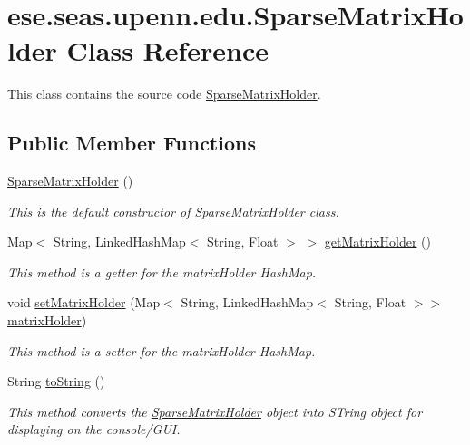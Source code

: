 \hypertarget{classese_1_1seas_1_1upenn_1_1edu_1_1_sparse_matrix_holder}{}\section{ese.\+seas.\+upenn.\+edu.\+Sparse\+Matrix\+Holder Class Reference}
\label{classese_1_1seas_1_1upenn_1_1edu_1_1_sparse_matrix_holder}


This class contains the source code \hyperlink{classese_1_1seas_1_1upenn_1_1edu_1_1_sparse_matrix_holder}{Sparse\+Matrix\+Holder}.  


\subsection*{Public Member Functions}
\begin{DoxyCompactItemize}
\item 
\hyperlink{classese_1_1seas_1_1upenn_1_1edu_1_1_sparse_matrix_holder_a53e71fa302066a4bd438da07367a6f41}{Sparse\+Matrix\+Holder} ()
\begin{DoxyCompactList}\small\item\em This is the default constructor of \hyperlink{classese_1_1seas_1_1upenn_1_1edu_1_1_sparse_matrix_holder}{Sparse\+Matrix\+Holder} class. \end{DoxyCompactList}\item 
Map$<$ String, Linked\+Hash\+Map$<$ String, Float $>$ $>$ \hyperlink{classese_1_1seas_1_1upenn_1_1edu_1_1_sparse_matrix_holder_af4939e0fb08c94f4449078f520bdede6}{get\+Matrix\+Holder} ()
\begin{DoxyCompactList}\small\item\em This method is a getter for the matrix\+Holder Hash\+Map. \end{DoxyCompactList}\item 
void \hyperlink{classese_1_1seas_1_1upenn_1_1edu_1_1_sparse_matrix_holder_a20d7d37cfc84fb9468a1581a4f1168e0}{set\+Matrix\+Holder} (Map$<$ String, Linked\+Hash\+Map$<$ String, Float $>$$>$ \hyperlink{classese_1_1seas_1_1upenn_1_1edu_1_1_sparse_matrix_holder_afd2e06193d5560f30e1f1b6b0d71cfe7}{matrix\+Holder})
\begin{DoxyCompactList}\small\item\em This method is a setter for the matrix\+Holder Hash\+Map. \end{DoxyCompactList}\item 
String \hyperlink{classese_1_1seas_1_1upenn_1_1edu_1_1_sparse_matrix_holder_aa236d3257451a1d086fb069abc0a1e32}{to\+String} ()
\begin{DoxyCompactList}\small\item\em This method converts the \hyperlink{classese_1_1seas_1_1upenn_1_1edu_1_1_sparse_matrix_holder}{Sparse\+Matrix\+Holder} object into S\+Tring object for displaying on the console/\+G\+U\+I. \end{DoxyCompactList}\end{DoxyCompactItemize}
